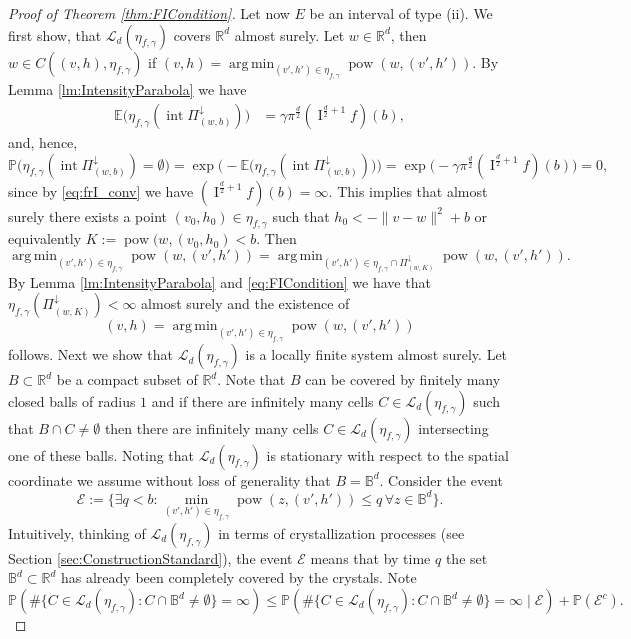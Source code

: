 \documentclass[11pt,a4paper]{article}
\theoremstyle{plain}
\theoremstyle{definition}
\theoremstyle{remark}
\def\BB{\mathbb{B}}
\def\EE{\mathbb{E}}
\def\PP{\mathbb{P}}
\def\RR{\mathbb{R}}
\def\cL{\mathcal{L}}
\newcommand{\frI}{\mathop{\mathrm{I}}\nolimits}
\newcommand{\pow}{\mathop{\mathrm{pow}}\nolimits}
\newcommand{\inter}{\operatorname{int}}
\DeclareMathOperator*{\argmin}{arg\,min}
\begin{document}
\begin{proof}[Proof of Theorem \ref{thm:FICondition}]
    Let now $E$ be an interval of type (ii). We first show, that $\cL_d(\eta_{f,\gamma})$ covers $\RR^d$ almost surely. Let $w\in \RR^d$, then $w\in C((v,h),\eta_{f,\gamma})$ if $(v,h)=\argmin_{(v',h')\in \eta_{f,\gamma}} \pow(w,(v',h'))$. By Lemma \ref{lm:IntensityParabola} we have 
    \begin{align*}
        \EE\big(\eta_{f,\gamma}(\inter \Pi_{(w,b)}^\downarrow)\big) &=  \gamma \pi^{\frac{d}{2}}(\frI^{\frac{d}{2}+1}f)(b),
    \end{align*}
    and, hence,
    \[
        \PP\big(\eta_{f,\gamma}(\inter \Pi_{(w,b)}^\downarrow) = \emptyset\big) = \exp\big(-\EE\big(\eta_{f,\gamma}(\inter \Pi_{(w,b)}^\downarrow)\big)\big) = \exp\big(-\gamma\pi^{\frac{d}{2}} (\frI^{\frac{d}{2}+1}f)(b)\big) = 0,
    \]
    since by \eqref{eq:frI_conv} we have $(\frI^{\frac{d}{2}+1}f)(b) = \infty$. This implies that almost surely there exists a point $(v_0,h_0)\in \eta_{f,\gamma}$ such that $h_0 < -\|v-w\|^2+b$ or equivalently $K:=\pow(w,(v_0,h_0)<b$. Then
    \[
        \argmin_{(v',h')\in \eta_{f,\gamma}} \pow(w,(v',h'))=\argmin_{(v',h')\in \eta_{f,\gamma}\cap \Pi_{(w,K)}^{\downarrow}} \pow(w,(v',h')).
    \]
    By Lemma \ref{lm:IntensityParabola} and \eqref{eq:FICondition} we have that $\eta_{f,\gamma}(\Pi_{(w,K)}^{\downarrow})<\infty$ almost surely and the existence of 
    \[
        (v,h)=\argmin_{(v',h')\in \eta_{f,\gamma}} \pow(w,(v',h'))
    \] 
    follows. Next we show that $\cL_d(\eta_{f,\gamma})$ is a locally finite system almost surely. Let $B\subset \RR^d$ be a compact subset of $\RR^d$. Note that $B$ can be covered by finitely many closed balls of radius $1$ and if there are infinitely many cells $C\in \cL_d(\eta_{f,\gamma})$ such that $B\cap C\neq \emptyset$ then there are infinitely many cells $C\in \cL_d(\eta_{f,\gamma})$ intersecting one of these balls. Noting that $\cL_d(\eta_{f,\gamma})$ is stationary with respect to the spatial coordinate we assume without loss of generality that $B=\BB^d$. Consider the event 
    \[
        \mathcal{E}:=\{\exists q<b:\min_{(v',h')\in \eta_{f,\gamma}} \pow(z,(v',h'))\le q \,\forall z\in \BB^d\}.
    \]
    Intuitively, thinking of $\cL_d(\eta_{f,\gamma})$ in terms of crystallization processes (see Section \ref{sec:ConstructionStandard}), the event $\mathcal{E}$ means that by time $q$ the set $\BB^d\subset \RR^d$ has already been completely covered by the crystals. Note
    \begin{equation}\label{eq:28.05.24_6}
        \PP(\#\{C\in \cL_d(\eta_{f,\gamma}): C\cap \BB^d \neq \emptyset\}=\infty)
        \le \PP(\#\{C\in \cL_d(\eta_{f,\gamma}): C\cap \BB^d \neq \emptyset\}=\infty\mid \mathcal{E})+\PP(\mathcal{E}^c).

\end{equation}
\end{proof}
\end{document}
